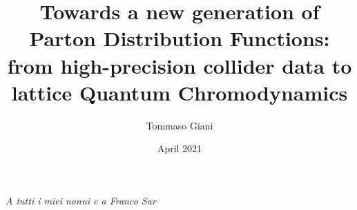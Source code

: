 \documentclass[a4paper,12pt,oneside,openright]{book}
\title{Towards a new generation of Parton Distribution Functions: from high-precision collider data to lattice
Quantum Chromodynamics }
\author{Tommaso Giani}
\date{April 2021} %
\begin{document}
\singlespacing
\maketitlepage
\eighteenptleading
\frontmatter




\cleardoublepage
{}
{\itshape A tutti i miei nonni
e a Franco Sar}
\cleardoublepage


\clearpage
\newpage
\tableofcontents
\mainmatter














\appendix
{}
\setcounter{equation}{0}








\clearpage
\newpage


\end{document}
